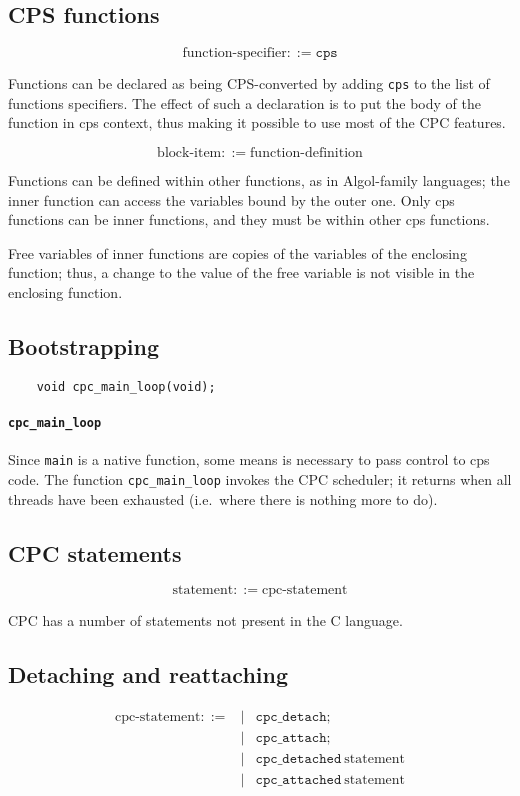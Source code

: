 \documentclass[a4paper]{report}
\begin{document}
\subsection{CPS functions} \label{sec:cpc-functions}

\[ \mbox{function-specifier} ::= \mathtt{cps} \]

Functions can be declared as being CPS-converted by adding {\tt cps}
to the list of functions specifiers.  The effect of such a declaration
is to put the body of the function in cps context, thus making it
possible to use most of the CPC features.

\[ \mbox{block-item} ::= \mbox{function-definition} \]

Functions can be defined within other functions, as in Algol-family
languages; the inner function can access the variables bound by the
outer one.  Only cps functions can be inner functions, and they must
be within other cps functions.

Free variables of inner functions are copies of the variables of the
enclosing function; thus, a change to the value of the free variable
is not visible in the enclosing function.

\subsection{Bootstrapping} \label{sec:bootstrapping}

\begin{verbatim}
    void cpc_main_loop(void);
\end{verbatim}

\paragraph{\tt cpc\_main\_loop} Since \verb|main| is a native
function, some means is necessary to pass control to cps code.  The
function \verb|cpc_main_loop| invokes the CPC scheduler; it returns
when all threads have been exhausted (i.e.\ where there is
nothing more to do).

\subsection{CPC statements}

\[ \mbox{statement} ::= \mbox{cpc-statement} \]

CPC has a number of statements not present in the C language.

\subsection{Detaching and reattaching} \label{sec:native-threads}
\begin{eqnarray*}
\mbox{cpc-statement} ::= &|& \mathtt{cpc\_detach} \mathtt{;} \\ &|&
\mathtt{cpc\_attach} \mathtt{;} \\ &|&
\mathtt{cpc\_detached}\ \mbox{statement} \\ &|&
\mathtt{cpc\_attached}\ \mbox{statement}
\end{eqnarray*}
\end{document}
